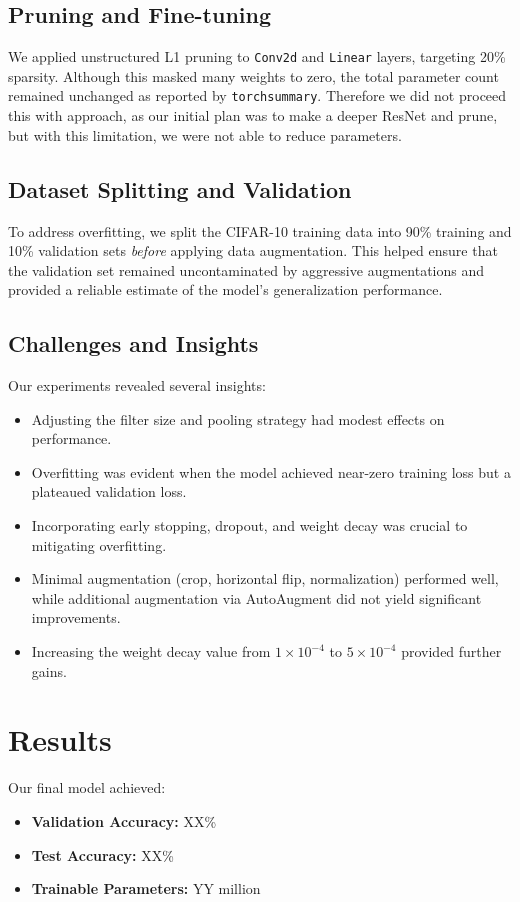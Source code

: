 \documentclass[letterpaper]{article} %
\begin{document}
\subsection{Pruning and Fine-tuning}
We applied unstructured L1 pruning to \texttt{Conv2d} and \texttt{Linear} layers, targeting 20\% sparsity. Although this masked many weights to zero, the total parameter count remained unchanged as reported by \texttt{torchsummary}. Therefore we did not proceed this with approach, as our initial plan was to make a deeper ResNet and prune, but with this limitation, we were not able to reduce parameters.

\subsection{Dataset Splitting and Validation}
To address overfitting, we split the CIFAR-10 training data into 90\% training and 10\% validation sets \textit{before} applying data augmentation. This helped ensure that the validation set remained uncontaminated by aggressive augmentations and provided a reliable estimate of the model’s generalization performance.

\subsection{Challenges and Insights}
Our experiments revealed several insights:
\begin{itemize}
    \item Adjusting the filter size and pooling strategy had modest effects on performance.
    \item Overfitting was evident when the model achieved near-zero training loss but a plateaued validation loss.
    \item Incorporating early stopping, dropout, and weight decay was crucial to mitigating overfitting.
    \item Minimal augmentation (crop, horizontal flip, normalization) performed well, while additional augmentation via AutoAugment did not yield significant improvements.
    \item Increasing the weight decay value from $1\times10^{-4}$ to $5\times10^{-4}$ provided further gains.
\end{itemize}

\section{Results}
Our final model achieved:
\begin{itemize}
    \item \textbf{Validation Accuracy:} XX\%
    \item \textbf{Test Accuracy:} XX\%
    \item \textbf{Trainable Parameters:} YY million
\end{itemize}
\end{document}
